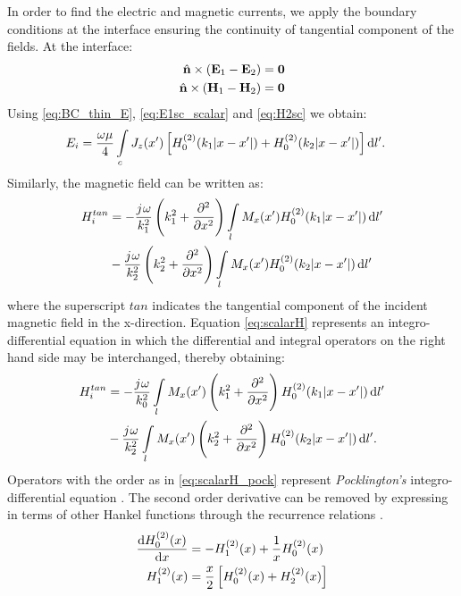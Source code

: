 In order to find the electric and magnetic currents, we apply the boundary conditions at the interface ensuring the continuity of tangential component of the fields. At the interface:
%
\begin{subequations}
  \begin{align}
    \hat{\mathbf{n}} \times (\mathbf{E}_1 - \mathbf{E}_2) ={}& \mathbf{0}
    \label{eq:BC_thin_E}\\
    \hat{\mathbf{n}} \times (\mathbf{H}_1 - \mathbf{H}_2) ={}& \mathbf{0}
    \label{eq:BC_thin_H}
  \end{align}
  \label{eq:BC_thin}%
\end{subequations}%
%
Using \eqref{eq:BC_thin_E}, \eqref{eq:E1sc_scalar} and \eqref{eq:H2sc} we obtain:
%
\begin{align}
  E_i &= \frac{\omega \mu}{4} \int\limits_c J_z(x') \left[ H_0^{(2)}(k_1 |x - x'|) + H_0^{(2)}(k_2 |x - x'|)\right] \mathop{}\!\mathrm{d}{l'}.
  \label{eq:scalarE}
\end{align}
%
Similarly, the magnetic field can be written as:
%
\begin{align}
  H_i^{tan} &=  -\frac{{j}\mkern1mu \omega}{k_1^2}\left(k_1^2 +  \pdv[2]{}{x} \right) \int\limits_{l} M_x(x') H_0^{(2)}(k_1 |x - x'|) \mathop{}\!\mathrm{d}{l'} \notag\\
  & - \frac{{j}\mkern1mu \omega}{k_2^2}\left(k_2^2 +  \pdv[2]{}{x} \right) \int\limits_{l} M_x(x') H_0^{(2)}(k_2 |x - x'|) \mathop{}\!\mathrm{d}{l'}
  \label{eq:scalarH}
\end{align}
%
where the superscript $tan$ indicates the tangential component of the incident magnetic field in the x-direction. Equation \eqref{eq:scalarH} represents an integro-differential equation in which the differential and integral operators on the right hand side may be interchanged, thereby obtaining:
%
\begin{align}
  H_i^{tan} &=  -\frac{{j}\mkern1mu \omega}{k_0^2} \int\limits_{l} M_x(x') \left(k_1^2 +  \pdv[2]{}{x} \right) H_0^{(2)}(k_1 |x - x'|) \mathop{}\!\mathrm{d}{l'} \notag\\
  & - \frac{{j}\mkern1mu \omega}{k_2^2} \int\limits_{l} M_x(x') \left(k_2^2 +  \pdv[2]{}{x} \right) H_0^{(2)}(k_2 |x - x'|) \mathop{}\!\mathrm{d}{l'}.
  \label{eq:scalarH_pock}
\end{align}
%
Operators with the order as in \eqref{eq:scalarH_pock} represent \emph{Pocklington's} integro-differential equation \cite{Stutzman2012}. The second order derivative can be removed by expressing in terms of other Hankel functions through the recurrence relations \cite[p. 361]{Abramowitz2012}.
%
\begin{subequations}
  \begin{align}
    \dv{H_0^{(2)}(x)}{x} &= -H_{1}^{(2)}(x) + \frac{1}{x} H_0^{(2)}(x)
    \label{eq:Hankel_ID1}\\
    H_{1}^{(2)}(x)  &= \frac{x}{2} \left[H_{0}^{(2)}(x) + H_{2}^{(2)}(x)\right]
    \label{eq:Hankel_ID2}
  \end{align}
  \label{eq:Hankel_ID}%
\end{subequations}%
